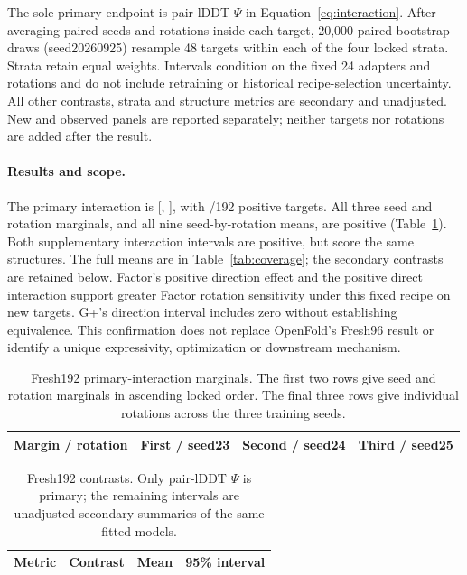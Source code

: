The sole primary endpoint is pair-lDDT $\Psi$ in Equation~\ref{eq:interaction}.
After averaging paired seeds and rotations inside each target, 20,000 paired
bootstrap draws (seed20260925) resample 48 targets within each of the four
locked strata. Strata retain equal weights. Intervals condition on the fixed
24 adapters and rotations and do not include retraining or historical
recipe-selection uncertainty. All other contrasts, strata and structure
metrics are secondary and unadjusted. New and observed panels are reported
separately; neither targets nor rotations are added after the result.

\paragraph{Results and scope.}
The primary interaction is 
[, ], with
/192 positive targets. All three seed and rotation
marginals, and all nine seed-by-rotation means, are positive
(Table~\ref{tab:fresh192_marginals}). Both supplementary interaction intervals
are positive, but score the same structures. The full means are in
Table~\ref{tab:coverage}; the secondary contrasts are retained below.
Factor's positive direction effect and the positive direct interaction support
greater Factor rotation sensitivity under this fixed recipe on new targets.
G+'s direction interval includes zero without establishing equivalence.
This confirmation does not replace OpenFold's Fresh96 result or identify a
unique expressivity, optimization or downstream mechanism.

\begin{table}[!htbp]\centering\small
\caption{Fresh192 primary-interaction marginals. The first two rows give
seed and rotation marginals in ascending locked order. The final three rows
give individual rotations across the three training seeds.}
\label{tab:fresh192_marginals}
\begin{tabular}{lrrr}\toprule
Margin / rotation & First / seed23 & Second / seed24 & Third / seed25 \\\midrule

\end{tabular}\end{table}

\begin{table}[!htbp]\centering\footnotesize
\caption{Fresh192 contrasts. Only pair-lDDT $\Psi$ is primary; the remaining
intervals are unadjusted secondary summaries of the same fitted models.}
\label{tab:fresh192_contrasts}
\begin{tabular}{llll}\toprule
Metric & Contrast & Mean & 95\% interval \\\midrule

\end{tabular}\end{table}

